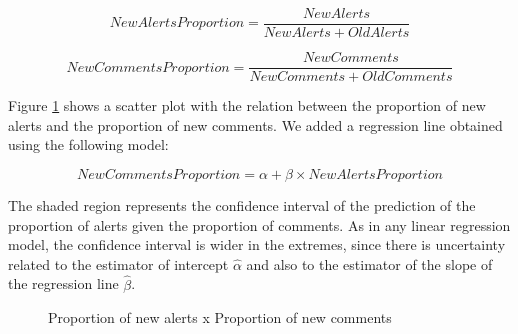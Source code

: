 \documentclass[
]{article}
\begin{document}
\[NewAlertsProportion = \frac{NewAlerts}{NewAlerts + OldAlerts}\]

\[NewCommentsProportion = \frac{NewComments}{NewComments + OldComments}\]

%
%

%
%



Figure \ref{scatter_prop} shows a scatter plot with the relation between the proportion of new alerts and the proportion of new comments. We added a regression line obtained using the following model:

\[ NewCommentsProportion = \alpha + \beta \times NewAlertsProportion \]

The shaded region represents the confidence interval of the prediction of the proportion of alerts given the proportion of comments. As in any linear regression model, the confidence interval is wider in the extremes, since there is uncertainty related to the estimator of intercept \(\hat{\alpha}\) and also to the estimator of the slope of the regression line \(\hat{\beta}\).
   
\begin{figure}
    \centering
    \caption{\label{scatter_prop}Proportion of new alerts x Proportion of
    new comments}
\end{figure}
\end{document}
